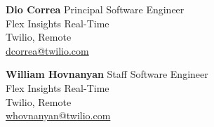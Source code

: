 \item \textbf{Dio Correa} \hfill {Principal Software Engineer}\\
            Flex Insights Real-Time\\
            Twilio, Remote\\
            \faEnvelope \hspace{0.5mm}
            \href{mailto:dcorrea@twilio.com}{dcorrea@twilio.com}
        
\item \textbf{William Hovnanyan} \hfill {Staff Software Engineer}\\
    Flex Insights Real-Time\\
    Twilio, Remote\\
    \faEnvelope \hspace{0.5mm} \href{mailto:whovnanyan@twilio.com}{whovnanyan@twilio.com}